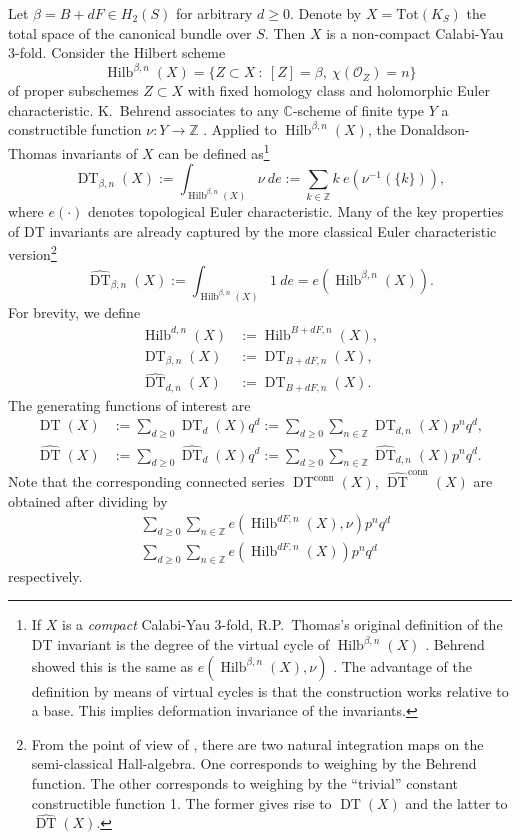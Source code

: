 \documentclass{amsart}
\theoremstyle{definition}
\newcommand{\CC} {\mathbb{C}}          %
\newcommand{\ZZ} {\mathbb{Z}}		%
\renewcommand{\O}{\mathcal{O}}
\newcommand{\Hilb}{\operatorname{Hilb}}
\newcommand{\DT}{\operatorname{DT}}
\newcommand{\conn}{\operatorname{conn}}
\begin{document}
Let $\beta = B+dF \in H_2(S)$ for arbitrary $d \geq 0$. Denote by $X = \mathrm{Tot}(K_S)$ the total space of the canonical bundle over $S$. Then $X$ is a non-compact Calabi-Yau 3-fold. Consider the Hilbert scheme
$$
\Hilb^{\beta,n}(X) = \{ Z \subset X \ : \ [Z] = \beta, \ \chi(\O_Z) = n\}
$$
of proper subschemes $Z \subset X$ with fixed homology class and holomorphic Euler characteristic. K.~Behrend associates to any $\CC$-scheme of finite type $Y$ a constructible function $\nu : Y \rightarrow \ZZ$ \cite{Beh}. Applied to $\Hilb^{\beta,n}(X)$, the Donaldson-Thomas invariants of $X$ can be defined as\footnote{If $X$ is a \emph{compact} Calabi-Yau 3-fold, R.P.~Thomas's original definition of the DT invariant is the degree of the virtual cycle of $\Hilb^{\beta,n}(X)$ \cite{Tho}. Behrend showed this is the same as $e(\Hilb^{\beta,n}(X),\nu)$ \cite{Beh}. The advantage of the definition by means of virtual cycles is that the construction works relative to a base. This implies deformation invariance of the invariants.} 
$$
\DT_{\beta,n}(X) := \int_{\Hilb^{\beta,n}(X)} \nu \ de := \sum_{k \in \ZZ} k \ e(\nu^{-1}(\{k\})),
$$
where $e(\cdot)$ denotes topological Euler characteristic. Many of the key properties of DT invariants are already captured by the more classical Euler characteristic version\footnote{From the point of view of \cite{JS, Bri}, there are two natural integration maps on the semi-classical Hall-algebra. One corresponds to weighing by the Behrend function. The other corresponds to weighing by the ``trivial'' constant constructible function 1. The former gives rise to $\DT(X)$ and the latter to $\widehat{\DT}(X)$.}
$$
\widehat{\DT}_{\beta,n}(X) := \int_{\Hilb^{\beta,n}(X)} 1 \ de = e(\Hilb^{\beta,n}(X)).
$$
For brevity, we define
\begin{align*}
\Hilb^{d,n}(X) &:=\Hilb^{B+dF,n}(X), \\
\DT_{\beta,n}(X) &:= \DT_{B+dF,n}(X), \\
\widehat{\DT}_{d,n}(X) &:= \DT_{B+dF,n}(X).
\end{align*}
The generating functions of interest are
\begin{align*}
\DT(X) &:= \sum_{d \geq 0} \DT_d(X) q^d := \sum_{d \geq 0} \sum_{n \in \ZZ} \DT_{d,n}(X) p^n q^d, \\
\widehat{\DT}(X) &:= \sum_{d \geq 0} \widehat{\DT}_d(X) q^d := \sum_{d \geq 0} \sum_{n \in \ZZ} \widehat{\DT}_{d,n}(X) p^n q^d.
\end{align*}
Note that the corresponding connected series $\DT^{\conn}(X)$, $\widehat{\DT}^{\conn}(X)$ are obtained after dividing by
\begin{align*}
&\sum_{d \geq 0} \sum_{n \in \ZZ} e(\Hilb^{dF,n}(X),\nu) p^n q^d \\
&\sum_{d \geq 0} \sum_{n \in \ZZ} e(\Hilb^{dF,n}(X)) p^n q^d
\end{align*}
respectively.
\end{document}
